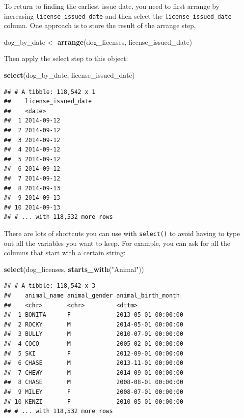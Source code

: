 \documentclass[]{Nemilov}
\newenvironment{Shaded}{\begin{snugshade}}{\end{snugshade}}
\newcommand{\KeywordTok}[1]{\textcolor[rgb]{0.13,0.29,0.53}{\textbf{#1}}}
\newcommand{\NormalTok}[1]{#1}
\newcommand{\StringTok}[1]{\textcolor[rgb]{0.31,0.60,0.02}{#1}}
\begin{document}
To return to finding the earliest issue date, you need to first arrange by increasing \texttt{license\_issued\_date} and then select the \texttt{license\_issued\_date} column. One approach is to store the result of the arrange step,

\begin{Shaded}
\begin{Highlighting}[]
\NormalTok{dog_by_date <-}\StringTok{ }\KeywordTok{arrange}\NormalTok{(dog_licenses, license_issued_date)}
\end{Highlighting}
\end{Shaded}

Then apply the select step to this object:

\begin{Shaded}
\begin{Highlighting}[]
\KeywordTok{select}\NormalTok{(dog_by_date, license_issued_date)}
\end{Highlighting}
\end{Shaded}

\begin{verbatim}
## # A tibble: 118,542 x 1
##    license_issued_date
##    <date>             
##  1 2014-09-12         
##  2 2014-09-12         
##  3 2014-09-12         
##  4 2014-09-12         
##  5 2014-09-12         
##  6 2014-09-12         
##  7 2014-09-12         
##  8 2014-09-13         
##  9 2014-09-13         
## 10 2014-09-13         
## # ... with 118,532 more rows
\end{verbatim}

There are lots of shortcuts you can use with \texttt{select()} to avoid having to type out all the variables you want to keep. For example, you can ask for all the columns that start with a certain string:

\begin{Shaded}
\begin{Highlighting}[]
\KeywordTok{select}\NormalTok{(dog_licenses, }\KeywordTok{starts_with}\NormalTok{(}\StringTok{"Animal"}\NormalTok{))}
\end{Highlighting}
\end{Shaded}

\begin{verbatim}
## # A tibble: 118,542 x 3
##    animal_name animal_gender animal_birth_month 
##    <chr>       <chr>         <dttm>             
##  1 BONITA      F             2013-05-01 00:00:00
##  2 ROCKY       M             2014-05-01 00:00:00
##  3 BULLY       M             2010-07-01 00:00:00
##  4 COCO        M             2005-02-01 00:00:00
##  5 SKI         F             2012-09-01 00:00:00
##  6 CHASE       M             2013-11-01 00:00:00
##  7 CHEWY       M             2014-09-01 00:00:00
##  8 CHASE       M             2008-08-01 00:00:00
##  9 MILEY       F             2008-07-01 00:00:00
## 10 KENZI       F             2010-05-01 00:00:00
## # ... with 118,532 more rows
\end{verbatim}
\end{document}
